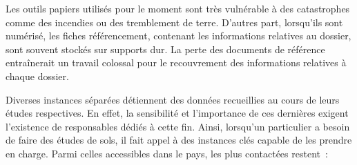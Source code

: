\par
Les outils papiers utilisés pour le moment sont très vulnérable à des
catastrophes comme des incendies ou des tremblement de terre. D'autres
part, lorsqu'ils sont numérisé, les fiches référencement, contenant les
informations relatives au dossier, sont souvent stockés sur supports
dur. La perte des documents de référence entraînerait un travail
colossal pour le recouvrement des informations relatives à chaque 
dossier.
\par
Diverses instances séparées détiennent des données recueillies au cours
de leurs études respectives. En effet, la sensibilité et l’importance de
ces dernières exigent l’existence de responsables dédiés à cette fin. 
Ainsi, lorsqu’un particulier a besoin de faire des études de sols, il 
fait appel à des instances clés capable de les prendre en charge. 
Parmi celles accessibles dans le pays, les plus contactées restent :
